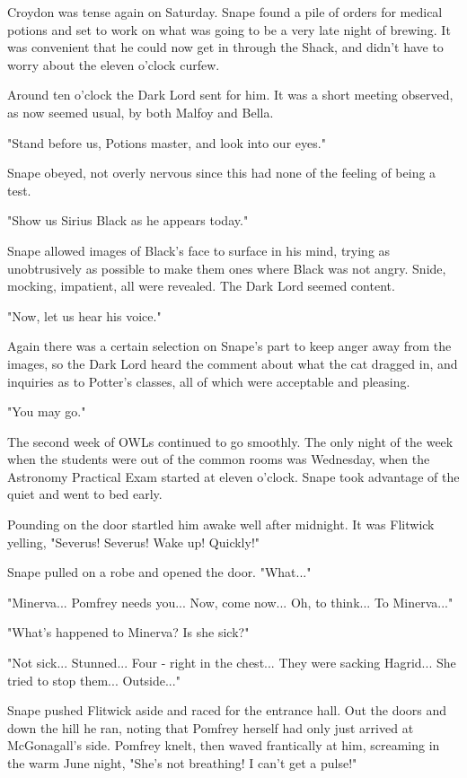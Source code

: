 Croydon was tense again on Saturday. Snape found a pile of orders for medical potions and set to work on what was going to be a very late night of brewing. It was convenient that he could now get in through the Shack, and didn't have to worry about the eleven o'clock curfew.

Around ten o'clock the Dark Lord sent for him. It was a short meeting observed, as now seemed usual, by both Malfoy and Bella.

"Stand before us, Potions master, and look into our eyes."

Snape obeyed, not overly nervous since this had none of the feeling of being a test.

"Show us Sirius Black as he appears today."

Snape allowed images of Black's face to surface in his mind, trying as unobtrusively as possible to make them ones where Black was not angry. Snide, mocking, impatient, all were revealed. The Dark Lord seemed content.

"Now, let us hear his voice."

Again there was a certain selection on Snape's part to keep anger away from the images, so the Dark Lord heard the comment about what the cat dragged in, and inquiries as to Potter's classes, all of which were acceptable and pleasing.

"You may go."

The second week of OWLs continued to go smoothly. The only night of the week when the students were out of the common rooms was Wednesday, when the Astronomy Practical Exam started at eleven o'clock. Snape took advantage of the quiet and went to bed early.

Pounding on the door startled him awake well after midnight. It was Flitwick yelling, "Severus! Severus! Wake up! Quickly!"

Snape pulled on a robe and opened the door. "What..."

"Minerva... Pomfrey needs you... Now, come now... Oh, to think... To Minerva..."

"What's happened to Minerva? Is she sick?"

"Not sick... Stunned... Four - right in the chest... They were sacking Hagrid... She tried to stop them... Outside..."

Snape pushed Flitwick aside and raced for the entrance hall. Out the doors and down the hill he ran, noting that Pomfrey herself had only just arrived at McGonagall's side. Pomfrey knelt, then waved frantically at him, screaming in the warm June night, "She's not breathing! I can't get a pulse!"


